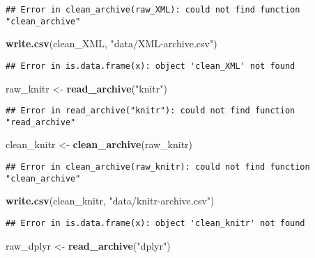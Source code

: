 \documentclass[]{article}
\newenvironment{Shaded}{\begin{snugshade}}{\end{snugshade}}
\newcommand{\KeywordTok}[1]{\textcolor[rgb]{0.13,0.29,0.53}{\textbf{#1}}}
\newcommand{\StringTok}[1]{\textcolor[rgb]{0.31,0.60,0.02}{#1}}
\newcommand{\NormalTok}[1]{#1}
\begin{document}
\begin{verbatim}
## Error in clean_archive(raw_XML): could not find function "clean_archive"
\end{verbatim}

\begin{Shaded}
\begin{Highlighting}[]
\KeywordTok{write.csv}\NormalTok{(clean_XML, }\StringTok{"data/XML-archive.csv"}\NormalTok{)}
\end{Highlighting}
\end{Shaded}

\begin{verbatim}
## Error in is.data.frame(x): object 'clean_XML' not found
\end{verbatim}

\begin{Shaded}
\begin{Highlighting}[]
\NormalTok{raw_knitr <-}\StringTok{ }\KeywordTok{read_archive}\NormalTok{(}\StringTok{"knitr"}\NormalTok{)}
\end{Highlighting}
\end{Shaded}

\begin{verbatim}
## Error in read_archive("knitr"): could not find function "read_archive"
\end{verbatim}

\begin{Shaded}
\begin{Highlighting}[]
\NormalTok{clean_knitr <-}\StringTok{ }\KeywordTok{clean_archive}\NormalTok{(raw_knitr)}
\end{Highlighting}
\end{Shaded}

\begin{verbatim}
## Error in clean_archive(raw_knitr): could not find function "clean_archive"
\end{verbatim}

\begin{Shaded}
\begin{Highlighting}[]
\KeywordTok{write.csv}\NormalTok{(clean_knitr, }\StringTok{"data/knitr-archive.csv"}\NormalTok{)}
\end{Highlighting}
\end{Shaded}

\begin{verbatim}
## Error in is.data.frame(x): object 'clean_knitr' not found
\end{verbatim}

\begin{Shaded}
\begin{Highlighting}[]
\NormalTok{raw_dplyr <-}\StringTok{ }\KeywordTok{read_archive}\NormalTok{(}\StringTok{"dplyr"}\NormalTok{)}
\end{Highlighting}
\end{Shaded}
\end{document}
